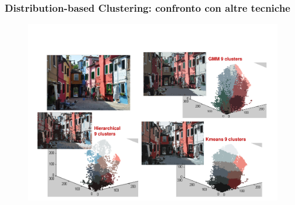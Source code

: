 \begin{frame}

	\frametitle{{\color{GradientDescentDiagramOrange}Distribution-based Clustering}: confronto con altre tecniche}

		\begin{figure}[!htbp]
				\centering
				\includegraphics[angle=0,width=0.9\linewidth]{images/unsupervised/gaussian_mixture/hierarchical_vs_kmeans_vs_gmm.pdf}
			\end{figure}

\end{frame}
